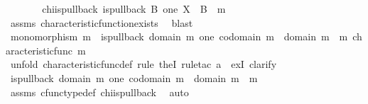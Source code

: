 \begin{isabellebody}
%
\isadelimproof
%
\endisadelimproof
%
\isatagproof
{}\isamarkupfalse%
\ {\isacharminus}{\kern0pt}\isanewline
\ \ \isamarkupfalse%
\ {\isasymchi}\ \ chi{\isacharunderscore}{\kern0pt}is{\isacharunderscore}{\kern0pt}pullback{\isacharcolon}{\kern0pt}\ {\isachardoublequoteopen}is{\isacharunderscore}{\kern0pt}pullback\ B\ one\ X\ {\isasymOmega}\ {\isacharparenleft}{\kern0pt}{\isasymbeta}\isactrlbsub B\isactrlesub {\isacharparenright}{\kern0pt}\ {\isasymt}\ m\ {\isasymchi}{\isachardoublequoteclose}\isanewline
\ \ \ \ \isamarkupfalse%
\ assms\ characteristic{\isacharunderscore}{\kern0pt}function{\isacharunderscore}{\kern0pt}exists\ \isamarkupfalse%
\ blast\isanewline
\isanewline
\ \ \isamarkupfalse%
\ {\isachardoublequoteopen}monomorphism\ m\ {\isasymlongrightarrow}\ is{\isacharunderscore}{\kern0pt}pullback\ {\isacharparenleft}{\kern0pt}domain\ m{\isacharparenright}{\kern0pt}\ one\ {\isacharparenleft}{\kern0pt}codomain\ m{\isacharparenright}{\kern0pt}\ {\isasymOmega}\ {\isacharparenleft}{\kern0pt}{\isasymbeta}\isactrlbsub domain\ m\isactrlesub {\isacharparenright}{\kern0pt}\ {\isasymt}\ m\ {\isacharparenleft}{\kern0pt}characteristic{\isacharunderscore}{\kern0pt}func\ m{\isacharparenright}{\kern0pt}{\isachardoublequoteclose}\isanewline
\ \ \isamarkupfalse%
\ {\isacharparenleft}{\kern0pt}unfold\ characteristic{\isacharunderscore}{\kern0pt}func{\isacharunderscore}{\kern0pt}def{\isacharcomma}{\kern0pt}\ rule\ theI{\isacharprime}{\kern0pt}{\isacharcomma}{\kern0pt}\ rule{\isacharunderscore}{\kern0pt}tac\ a{\isacharequal}{\kern0pt}{\isasymchi}\ \ ex{}I{\isacharcomma}{\kern0pt}\ clarify{\isacharparenright}{\kern0pt}\isanewline
\ \ \ \ \isamarkupfalse%
\ {\isachardoublequoteopen}is{\isacharunderscore}{\kern0pt}pullback\ {\isacharparenleft}{\kern0pt}domain\ m{\isacharparenright}{\kern0pt}\ one\ {\isacharparenleft}{\kern0pt}codomain\ m{\isacharparenright}{\kern0pt}\ {\isasymOmega}\ {\isacharparenleft}{\kern0pt}{\isasymbeta}\isactrlbsub domain\ m\isactrlesub {\isacharparenright}{\kern0pt}\ {\isasymt}\ m\ {\isasymchi}{\isachardoublequoteclose}\isanewline
\ \ \ \ \ \ \isamarkupfalse%
\ assms{\isacharparenleft}{\kern0pt}{}{\isacharparenright}{\kern0pt}\ cfunc{\isacharunderscore}{\kern0pt}type{\isacharunderscore}{\kern0pt}def\ chi{\isacharunderscore}{\kern0pt}is{\isacharunderscore}{\kern0pt}pullback\ \isamarkupfalse%
\ auto\isanewline
\ \ \ \ \isamarkupfalse%

\end{isabellebody}
